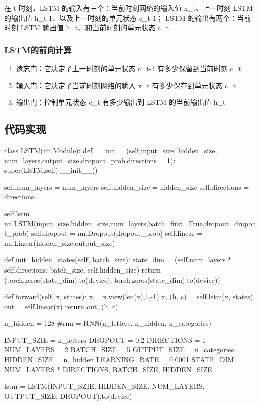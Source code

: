 \documentclass[UTF8,a4paper,10pt]{ctexart}
\begin{document}
在 t 时刻，LSTM 的输入有三个：当前时刻网络的输入值 x\_t、上一时刻 LSTM 的输出值 h\_t-1、以及上一时刻的单元状态 c\_t-1；
LSTM 的输出有两个：当前时刻 LSTM 输出值 h\_t、和当前时刻的单元状态 c\_t.

\subsubsection{LSTM的前向计算}

\begin{enumerate}
    \item 遗忘门：它决定了上一时刻的单元状态 c\_t-1 有多少保留到当前时刻 c\_t
    \item 输入门：它决定了当前时刻网络的输入 x\_t 有多少保存到单元状态 c\_t
    \item 输出门：控制单元状态 c\_t 有多少输出到 LSTM 的当前输出值 h\_t
\end{enumerate}


\subsection{代码实现}

\begin{python}
    class LSTM(nn.Module):
    def __init__(self,input_size, hidden_size, num_layers,output_size,dropout_prob,directions = 1):
        super(LSTM,self).__init__()

        self.num_layers = num_layers
        self.hidden_size = hidden_size
        self.directions = directions

        self.lstm = nn.LSTM(input_size,hidden_size,num_layers,batch_first=True,dropout=dropout_prob)
        self.dropout = nn.Dropout(dropout_prob)
        self.linear = nn.Linear(hidden_size,output_size)

    def init_hidden_states(self, batch_size):
        state_dim = (self.num_layers * self.directions, batch_size, self.hidden_size)
        return (torch.zeros(state_dim).to(device), torch.zeros(state_dim).to(device))

    def forward(self, x, states):
        x = x.view(len(x),1,-1)
        x, (h, c) = self.lstm(x, states)
        out = self.linear(x)
        return out, (h, c)


n_hidden = 128
#rnn = RNN(n_letters, n_hidden, n_categories)


INPUT_SZIE = n_letters
DROPOUT = 0.2
DIRECTIONS = 1
NUM_LAYERS = 2
BATCH_SIZE = 5
OUTPUT_SIZE = n_categories
HIDDEN_SIZE = n_hidden
LEARNING_RATE = 0.0001
STATE_DIM = NUM_LAYERS * DIRECTIONS, BATCH_SIZE, HIDDEN_SIZE

lstm = LSTM(INPUT_SZIE,
    HIDDEN_SIZE,
    NUM_LAYERS,
    OUTPUT_SIZE,
    DROPOUT).to(device)

\end{python}
\end{document}
